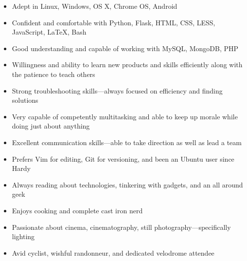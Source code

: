 \documentclass[letterpaper]{article}        %
\begin{document}




  \begin{multicols}{2}
    \begin{itemize}
    
    \item Adept in Linux, Windows, OS X, Chrome OS, Android
    
    \item Confident and comfortable with Python, Flask, HTML, CSS, LESS, JavaScript, \LaTeX{}, Bash
    
    \item Good understanding and capable of working with MySQL, MongoDB, PHP
    
    \item Willingness and ability to learn new products and skills efficiently along with the patience to teach others
    
    \item Strong troubleshooting skills---always focused on efficiency and finding solutions
    
    \item Very capable of competently multitasking and able to keep up morale while doing just about anything
    
    \item Excellent communication skills---able to take direction as well as lead a team
    
    \item Prefers Vim for editing, Git for versioning, and been an Ubuntu user since Hardy
    
    \item Always reading about technologies, tinkering with gadgets, and an all around geek
    
    \item Enjoys cooking and complete cast iron nerd
    
    \item Passionate about cinema, cinematography, still photography---specifically lighting
    
    \item Avid cyclist, wishful randonneur, and dedicated velodrome attendee
    
    \end{itemize}
  \end{multicols}
\end{document}
